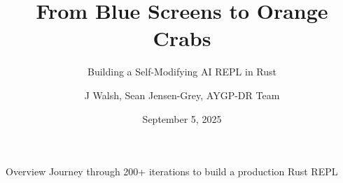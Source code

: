 \documentclass{beamer}
\title{From Blue Screens to Orange Crabs}
\subtitle{Building a Self-Modifying AI REPL in Rust}
\author{J Walsh, Sean Jensen-Grey, AYGP-DR Team}
\date{September 5, 2025}
\begin{document}
\maketitle
\begin{frame}{Overview}
Journey through 200+ iterations to build a production Rust REPL
\end{frame}
\end{document}
